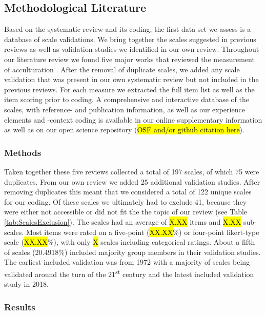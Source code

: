 \subsection{Methodological Literature}

Based on the systematic review and its coding, the first data set we
assess is a database of scale validations. We bring together the scales
suggested in previous reviews as well as validation studies we
identified in our own review. Throughout our literature review we found
five major works that reviewed the measurement of acculturation
\citep{Celenk2011, Maestas2000, Matsudaira2006, Wallace2010, Zane2004}.
After the removal of duplicate scales, we added any scale validation
that was present in our own systematic review but not included in the
previous reviews. For each measure we extracted the full item list as
well as the item scoring prior to coding. A comprehensive and
interactive database of the scales, with reference- and publication
information, as well as our experience elements and -context coding is
available in our online supplementary information as well as on our open
science repository (\hl{OSF and/or github citation here}).

\subsubsection{Methods}

Taken together these five reviews collected a total of 197 scales, of
which 75 were duplicates. From our own review we added 25 additional
validation studies. After removing duplicates this meant that we
considered a total of 122 unique scales for our coding. Of these scales
we ultimately had to exclude 41, because they were either not accessible
or did not fit the the topic of our review (see Table
\ref{tab:ScalesExclusion}). The scales had an average of \hl{X.XX} items
and \hl{X.XX} sub-scales. Most items were rated on a five-point
(\hl{XX.XX}\%) or four-point likert-type scale (\hl{XX.XX}\%), with only
\hl{X} scales including categorical ratings. About a fifth of scales
(20.4918\%) included majority group members in their validation studies.
The earliest included validation was from 1972 with a majority of scales
being validated around the turn of the 21\textsuperscript{st} century
and the latest included validation study in 2018.



\subsubsection{Results}

